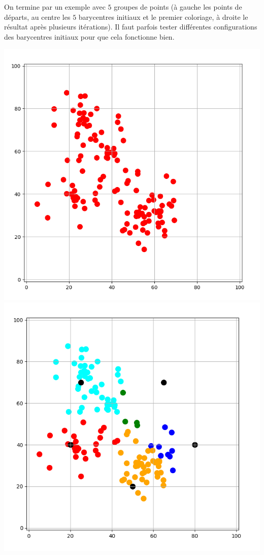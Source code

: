 \documentclass[11pt,class=report,crop=false]{standalone}
\begin{document}
\begin{activite}[Barycentres]
On termine par un exemple avec $5$ groupes de points (à gauche les points de départs, au centre les $5$ barycentres initiaux et le premier coloriage, à droite le résultat après plusieurs itérations). Il faut parfois tester différentes configurations des barycentres initiaux pour que cela fonctionne bien.
	\begin{center}
	\includegraphics[scale=\myscale,scale=0.21]{ecran_barycentres_exemple_bis_01}\quad
	\includegraphics[scale=\myscale,scale=0.22]{ecran_barycentres_exemple_bis_02}\quad

\end{center}
\end{activite}
\end{document}
